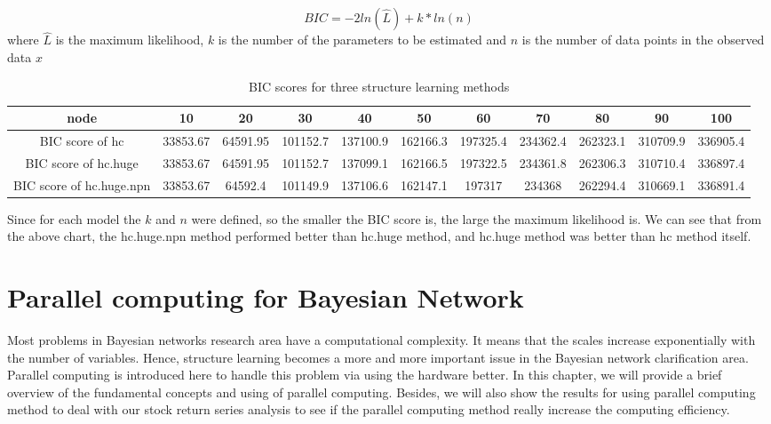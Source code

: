 \documentclass[12pt]{article}
\theoremstyle{plain}
\begin{document}
 \begin{equation}
BIC=-2ln(\hat{L})+ k*ln(n)
\end{equation}
where $\hat{L}$ is the maximum likelihood, $k$ is the number of the parameters to be estimated and $n$ is the number of data points in the observed data $x$


\begin{table}[h!]\tiny

  \caption{BIC scores for three structure learning methods}
\begin{center}
    \begin{tabular}{| c | c | c | c | c |c |c |c |c |c |c |}
    \hline
    node& 10 & 20 & 30& 40& 50& 60& 70& 80& 90& 100\\
    \hline
BIC score of hc &33853.67&64591.95&101152.7&137100.9&162166.3&197325.4&234362.4&262323.1&310709.9&336905.4\\
BIC score of hc.huge&33853.67&64591.95&101152.7&137099.1&162166.5&197322.5&234361.8&262306.3&310710.4&336897.4\\
BIC score of hc.huge.npn&33853.67&64592.4&101149.9&137106.6&162147.1&197317&234368&262294.4&310669.1&336891.4\\
\hline
\end{tabular}
  \end{center}
\end{table}

Since for each model the $k$ and $n$ were defined, so the smaller the BIC score is, the large the maximum likelihood is. We can see that from the above chart, the hc.huge.npn method performed better than hc.huge method, and hc.huge method was better than hc method itself.\\
\section{Parallel computing for Bayesian Network}
Most problems in Bayesian networks research area have a computational complexity. It means that the scales increase exponentially with the number of variables.  Hence, structure learning becomes a more and more important issue in the Bayesian network clarification area. Parallel computing is introduced here to handle this problem via using the hardware better.
In this chapter, we will provide a brief overview of the fundamental concepts and using of parallel computing. Besides, we will also show the results for using parallel computing method to deal with our stock return series analysis to see if the parallel computing method really increase the computing efficiency.
\end{document}
